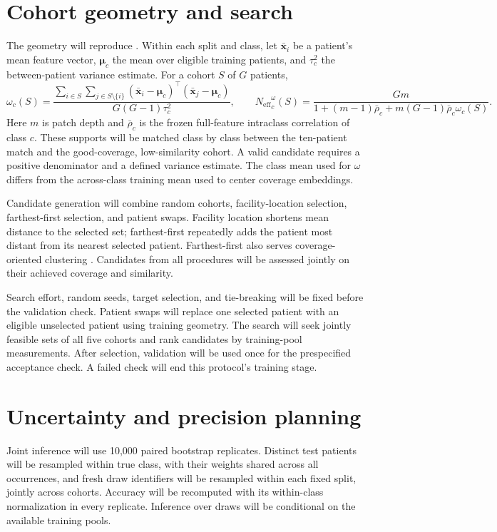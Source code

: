 \documentclass[11pt]{article}
\newcommand{\Neff}{N_{\mathrm{eff}}}
\begin{document}
\appendix
\section{Cohort geometry and search}
\label{app:quantities}
The geometry will reproduce \citet{queisler2026coverageRedundancy}. Within each split and class, let $\bar{\mathbf x}_i$ be a patient's mean feature vector, $\boldsymbol\mu_c$ the mean over eligible training patients, and $\tau_c^2$ the between-patient variance estimate. For a cohort $S$ of $G$ patients,
\begin{equation}
 \omega_c(S)=\frac{\displaystyle\sum_{i\in S}\sum_{j\in S\setminus\{i\}}
 (\bar{\mathbf x}_i-\boldsymbol\mu_c)^\top(\bar{\mathbf x}_j-\boldsymbol\mu_c)}
 {G(G-1)\tau_c^2},\qquad
 {\Neff}_{c}^{\omega}(S)=\frac{Gm}{1+(m-1)\bar\rho_c+m(G-1)\bar\rho_c\omega_c(S)}.
 \label{eq:support}
\end{equation}
\noindent Here $m$ is patch depth and $\bar\rho_c$ is the frozen full-feature intraclass correlation of class $c$. These supports will be matched class by class between the ten-patient match and the good-coverage, low-similarity cohort. A valid candidate requires a positive denominator and a defined variance estimate. The class mean used for $\omega$ differs from the across-class training mean used to center coverage embeddings.

Candidate generation will combine random cohorts, facility-location selection, farthest-first selection, and patient swaps. Facility location shortens mean distance to the selected set; farthest-first repeatedly adds the patient most distant from its nearest selected patient. Farthest-first also serves coverage-oriented clustering \citep{baram2004online}. Candidates from all procedures will be assessed jointly on their achieved coverage and similarity.

Search effort, random seeds, target selection, and tie-breaking will be fixed before the validation check. Patient swaps will replace one selected patient with an eligible unselected patient using training geometry. The search will seek jointly feasible sets of all five cohorts and rank candidates by training-pool measurements. After selection, validation will be used once for the prespecified acceptance check. A failed check will end this protocol's training stage.

\section{Uncertainty and precision planning}
\label{app:precision}
Joint inference will use 10,000 paired bootstrap replicates. Distinct test patients will be resampled within true class, with their weights shared across all occurrences, and fresh draw identifiers will be resampled within each fixed split, jointly across cohorts. Accuracy will be recomputed with its within-class normalization in every replicate. Inference over draws will be conditional on the available training pools.
\end{document}
